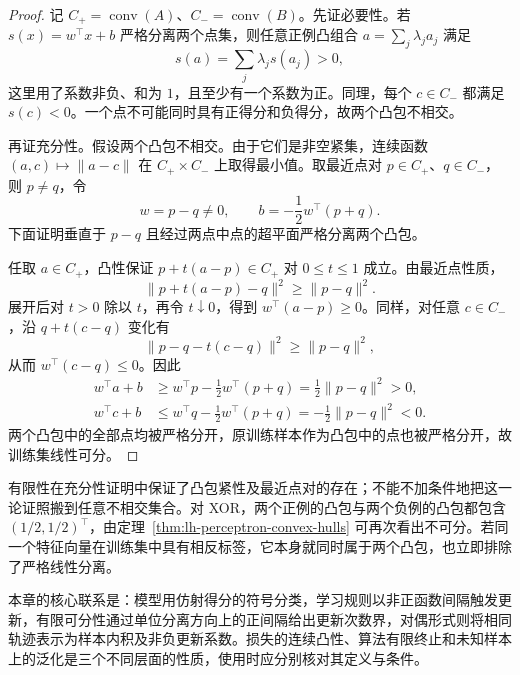 \begin{proof}
记 $C_+=\operatorname{conv}(A)$、$C_-=\operatorname{conv}(B)$。先证必要性。若 $s(x)=w^\top x+b$ 严格分离两个点集，则任意正例凸组合 $a=\sum_j\lambda_j a_j$ 满足
\[
s(a)=\sum_j\lambda_j s(a_j)>0,
\]
这里用了系数非负、和为 $1$，且至少有一个系数为正。同理，每个 $c\in C_-$ 都满足 $s(c)<0$。一个点不可能同时具有正得分和负得分，故两个凸包不相交。

再证充分性。假设两个凸包不相交。由于它们是非空紧集，连续函数 $(a,c)\mapsto\|a-c\|$ 在 $C_+\times C_-$ 上取得最小值。取最近点对 $p\in C_+$、$q\in C_-$，则 $p\neq q$，令
\[
w=p-q\neq0,
\qquad
b=-\frac12 w^\top(p+q).
\]
下面证明垂直于 $p-q$ 且经过两点中点的超平面严格分离两个凸包。

任取 $a\in C_+$，凸性保证 $p+t(a-p)\in C_+$ 对 $0\leq t\leq1$ 成立。由最近点性质，
\[
\|p+t(a-p)-q\|^2\geq\|p-q\|^2.
\]
展开后对 $t>0$ 除以 $t$，再令 $t\downarrow0$，得到 $w^\top(a-p)\geq0$。同样，对任意 $c\in C_-$，沿 $q+t(c-q)$ 变化有
\[
\|p-q-t(c-q)\|^2\geq\|p-q\|^2,
\]
从而 $w^\top(c-q)\leq0$。因此
\[
\begin{aligned}
w^\top a+b
&\geq w^\top p-\tfrac12w^\top(p+q)
=\tfrac12\|p-q\|^2>0,\\
w^\top c+b
&\leq w^\top q-\tfrac12w^\top(p+q)
=-\tfrac12\|p-q\|^2<0.
\end{aligned}
\]
两个凸包中的全部点均被严格分开，原训练样本作为凸包中的点也被严格分开，故训练集线性可分。
\end{proof}

有限性在充分性证明中保证了凸包紧性及最近点对的存在；不能不加条件地把这一论证照搬到任意不相交集合。对 XOR，两个正例的凸包与两个负例的凸包都包含 $(1/2,1/2)^\top$，由定理~\ref{thm:lh-perceptron-convex-hulls} 可再次看出不可分。若同一个特征向量在训练集中具有相反标签，它本身就同时属于两个凸包，也立即排除了严格线性分离。

本章的核心联系是：模型用仿射得分的符号分类，学习规则以非正函数间隔触发更新，有限可分性通过单位分离方向上的正间隔给出更新次数界，对偶形式则将相同轨迹表示为样本内积及非负更新系数。损失的连续凸性、算法有限终止和未知样本上的泛化是三个不同层面的性质，使用时应分别核对其定义与条件。






